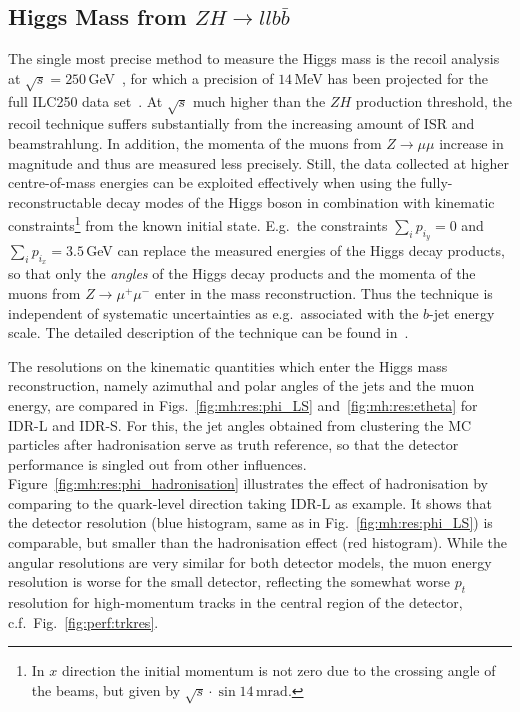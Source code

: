 \subsection{Higgs Mass from \texorpdfstring{$ZH \to ll b\bar{b}$}{ZH -> llbb}}

The single most precise method to measure the Higgs mass is the recoil analysis at $\sqrt{s}=250$\,GeV~\cite{Yan:2016xyx}, for which a precision of $14$\,MeV has been projected for the full ILC250 data set~\cite{Fujii:2017vwa}. At $\sqrt{s}$ much higher than the $ZH$ production threshold, the recoil
technique suffers substantially from the increasing amount of ISR and beamstrahlung. In addition, the momenta of the muons from $Z\to \mu\mu$ increase in magnitude and thus are measured less precisely. Still, the data collected at higher centre-of-mass energies can be exploited effectively when using the fully-reconstructable decay modes of the Higgs boson in combination with kinematic constraints\footnote{In $x$ direction the initial momentum is not zero due to the crossing angle of the beams, but given by $\sqrt{s} \cdot \sin{14\,\mathrm{mrad}}$.} from the known initial state. E.g.\ the constraints $\sum_i{p_{i_y}}=0$ and $\sum_i{p_{i_x}}=3.5$\,GeV can replace the measured energies of the Higgs decay products, so that only the {\it angles} of the Higgs decay products and the momenta of the muons from $Z\to\mu^+\mu^-$ enter in the mass reconstruction. Thus the technique is independent of systematic uncertainties as e.g.\ associated with the $b$-jet energy scale. The detailed description of the technique can be found in~\cite{ILDNote:MH}.

The resolutions on the kinematic quantities which enter the Higgs mass reconstruction, namely azimuthal and polar angles of the jets and the muon energy, are compared in Figs.~\ref{fig:mh:res:phi_LS} and~\ref{fig:mh:res:etheta} for IDR-L and IDR-S. For this, 
the jet angles obtained from clustering the MC particles after hadronisation serve as truth reference, so that the detector performance is singled out from other influences.  Figure~\ref{fig:mh:res:phi_hadronisation} illustrates the effect of hadronisation by comparing to the quark-level direction taking IDR-L as example. It shows that the detector resolution (blue histogram, same as in Fig.~\ref{fig:mh:res:phi_LS}) is comparable, but
smaller than the hadronisation effect (red histogram). While the angular resolutions are very similar for both detector models, the muon energy resolution is worse for the small detector, reflecting the somewhat worse $p_t$ resolution for high-momentum tracks in the central region of the detector, c.f.\ Fig.~\ref{fig:perf:trkres}. 
 
